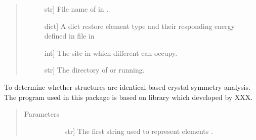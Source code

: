 \documentclass[letterpaper,10pt,english]{sphinxmanual}
\begin{document}
\begin{fulllineitems}
\begin{quote}
\begin{description}
\begin{description}
\item[{}] \leavevmode{[}str{]}
File name of  in .

\item[{}] \leavevmode{[}dict{]}
A dict restore element type and their responding energy defined in
 file in 

\item[{}] \leavevmode{[}int{]}
The site in which different can occupy.

\item[{}] \leavevmode{[}str{]}
The directory of  or  running.

\end{description}

\end{description}\end{quote}

\begin{fulllineitems}
\label{\detokenize{pygace:pygace.ce.CE.COMPARE_CRYSTAL}}
\end{fulllineitems}


\begin{fulllineitems}
\label{\detokenize{pygace:pygace.ce.CE.CORRDUMP}}
\end{fulllineitems}


\begin{fulllineitems}
\label{\detokenize{pygace:pygace.ce.CE.compare_crystal}}
To determine whether structures are identical based crystal symmetry
analysis. The program used in this package is based on  library
which developed by XXX.
\begin{quote}\begin{description}
\item[{Parameters}] \leavevmode\begin{description}
\item[{}] \leavevmode{[}str{]}
The first string used to represent elements .


\end{description}
\end{description}
\end{quote}
\end{fulllineitems}
\end{fulllineitems}
\end{document}
